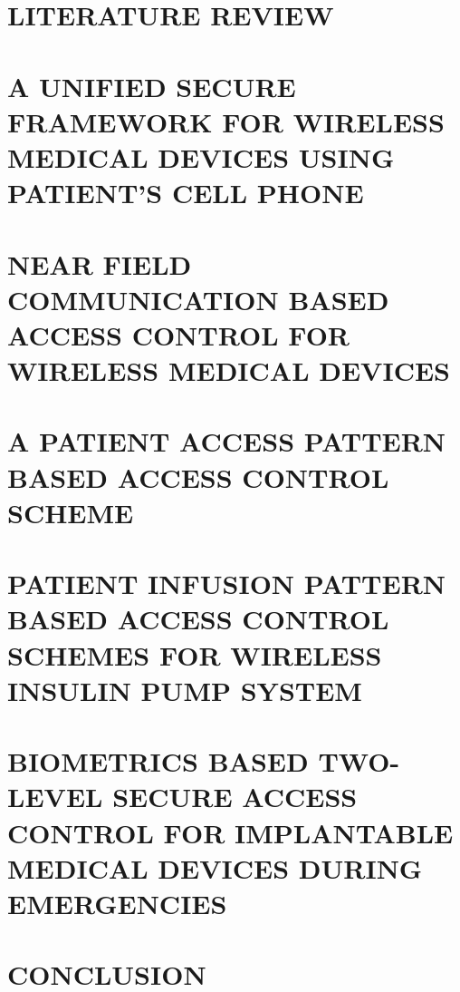 \documentclass[reqno,12pt,oneside]{report} %
\theoremstyle{plain}
\theoremstyle{definition}
\theoremstyle{remark}
\numberwithin{theorem}{chapter}
\begin{document}
\chapter{LITERATURE REVIEW}
 \label{chap:Particles}
 

\chapter{A UNIFIED SECURE FRAMEWORK FOR WIRELESS MEDICAL DEVICES USING PATIENT'S CELL PHONE}
 \label{chap:Particles}
 

\chapter{NEAR FIELD COMMUNICATION BASED ACCESS CONTROL FOR WIRELESS MEDICAL DEVICES}
 \label{chap:Particles}
 

\chapter{A PATIENT ACCESS PATTERN BASED ACCESS CONTROL SCHEME}
 \label{chap:Particles}
 

\chapter{PATIENT INFUSION PATTERN BASED ACCESS CONTROL SCHEMES FOR WIRELESS INSULIN PUMP SYSTEM}
 \label{chap:Particles}
 

\chapter{BIOMETRICS BASED TWO-LEVEL SECURE ACCESS CONTROL FOR IMPLANTABLE MEDICAL DEVICES DURING EMERGENCIES}
 \label{chap:Particles}
 

\chapter{CONCLUSION}
 \label{chap:Particles}
 


\startbibliography
 \begin{singlespace} %
  
  
 \end{singlespace}

 \startappendices
 \label{Carelink USB Driver Decoding}
 
\end{document}
